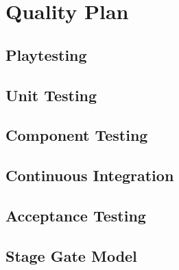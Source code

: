 \section{Quality Plan}
\label{section:quality}

\subsection{Playtesting}

\subsection{Unit Testing}

\subsection{Component Testing}

\subsection{Continuous Integration}

\subsection{Acceptance Testing}

\subsection{Stage Gate Model}